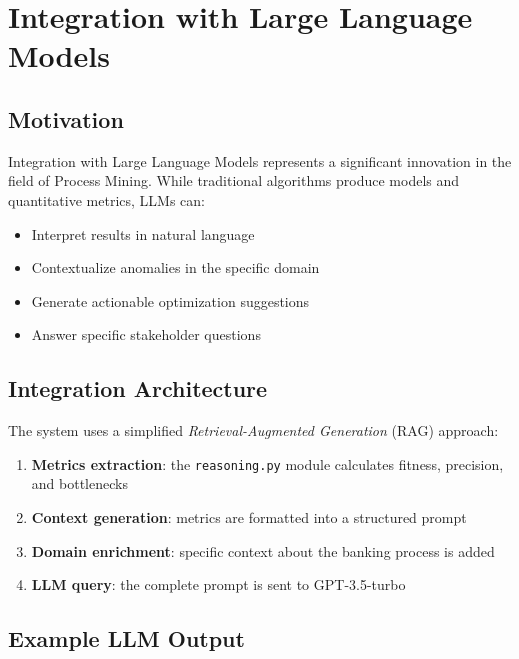 \documentclass[a4paper,twoside,12pt]{article}
\begin{document}
\section{Integration with Large Language Models}

\subsection{Motivation}

Integration with Large Language Models represents a significant innovation in the field of Process Mining. While traditional algorithms produce models and quantitative metrics, LLMs can:

\begin{itemize}
    \item Interpret results in natural language
    \item Contextualize anomalies in the specific domain
    \item Generate actionable optimization suggestions
    \item Answer specific stakeholder questions
\end{itemize}

\subsection{Integration Architecture}

The system uses a simplified \textit{Retrieval-Augmented Generation} (RAG) approach:

\begin{enumerate}
    \item \textbf{Metrics extraction}: the \texttt{reasoning.py} module calculates fitness, precision, and bottlenecks
    \item \textbf{Context generation}: metrics are formatted into a structured prompt
    \item \textbf{Domain enrichment}: specific context about the banking process is added
    \item \textbf{LLM query}: the complete prompt is sent to GPT-3.5-turbo
\end{enumerate}

\subsection{Example LLM Output}
\end{document}
